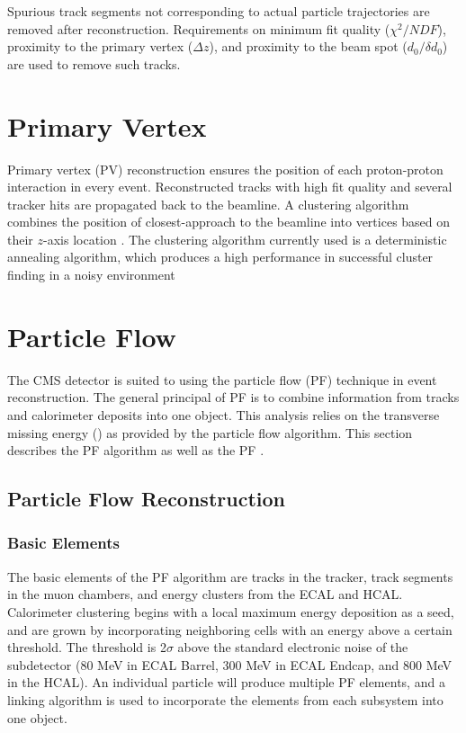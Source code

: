 Spurious track segments not corresponding to actual particle trajectories are removed after reconstruction. Requirements on minimum fit quality ($\chi^2/NDF$), proximity to the primary vertex ($\Delta z$), and proximity to the beam spot ($d_0/\delta d_0$) are used to remove such tracks. 

\section{Primary Vertex}
Primary vertex (PV) reconstruction ensures the position of each proton-proton interaction in every event. Reconstructed tracks with high fit quality and several tracker hits are propagated back to the beamline. A clustering algorithm combines the position of closest-approach to the beamline into vertices based on their $z$-axis location \cite{Chatrchyan:2014fea}. The clustering algorithm currently used is a deterministic annealing algorithm, which produces a high performance in successful cluster finding in a noisy environment \cite{Chabanat:2005zz}




\section{Particle Flow}
The CMS detector is suited to using the particle flow (PF) technique in event reconstruction. The general principal of PF is to combine information from tracks and calorimeter deposits into one object. This analysis relies on the transverse missing energy (\met) as provided by the particle flow algorithm. This section describes the PF algorithm as well as the PF \met. 

\subsection{Particle Flow Reconstruction}
\subsubsection{Basic Elements}
The basic elements of the PF algorithm are tracks in the tracker, track segments in the muon chambers, and energy clusters from the ECAL and HCAL. 
Calorimeter clustering begins with a local maximum energy deposition as a seed, and are grown by incorporating neighboring cells with an energy above a certain threshold. The threshold is 2$\sigma$ above the standard electronic noise of the subdetector (80 MeV in ECAL Barrel, 300 MeV in ECAL Endcap, and 800 MeV in the HCAL). 
An individual particle will produce multiple PF elements, and a linking algorithm is used to incorporate the elements from each subsystem into one object. 

